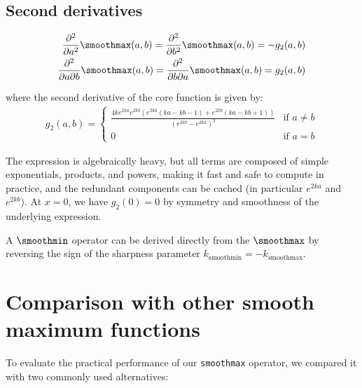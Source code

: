 \subsection*{Second derivatives}
\begin{align}
    \frac{\partial^2}{\partial a^2} \smoothmax(a, b) = \frac{\partial^2}{\partial b^2} \smoothmax(a, b) = - g_2(a, b) \\
    \frac{\partial^2}{\partial a \partial b} \smoothmax(a, b) = \frac{\partial^2}{\partial b \partial a} \smoothmax(a, b) = g_2(a, b)
\end{align}

where the second derivative of the core function is given by:
\begin{align}
    g_2(a, b) = \begin{cases}
        \frac{4ke^{2ka}e^{2kb} \left( e^{2ka} (ka-kb-1) + e^{2kb}(ka - kb + 1) \right)}{\left(e^{2kb}-e^{2ka} \right)^3} &\text{if } a \neq b \\
        0  &\text{if } a = b
    \end{cases}
\end{align}

The expression is algebraically heavy, but all terms are composed of simple exponentials, products, and powers, making it fast and safe to compute in practice, and the redundant components can be cached (in particular $e^{2ka}$ and $e^{2kb}$). At $x = 0$, we have $g_2(0) = 0$ by symmetry and smoothness of the underlying expression.

A $\smoothmin$ operator can be derived directly from the $\smoothmax$ by reversing the sign of the sharpness parameter $k_{\text{smoothmin}} = - k_{\text{smoothmax}}$.



\section{Comparison with other smooth maximum functions}
\label{sec:comparison-smoothmax}

To evaluate the practical performance of our \texttt{smoothmax} operator, we compared it with two commonly used alternatives:

